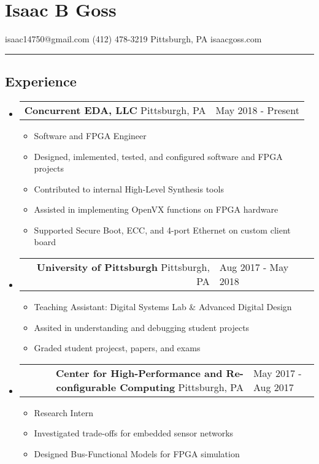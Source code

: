 \documentclass[18pt]{article}
\makeatletter
\providecommand{\tightlist}{
    \setlength{\itemsep}{0pt}\setlength{\parskip}{0pt}
}
\providecommand{\datetable}[2]{
    \begin{tabular*}{\textwidth}{@{}r @{\extracolsep{\fill}} l}
        #1 & #2
    \end{tabular*}
}
\makeatother
\begin{document}
    \section*{Isaac B Goss}\label{isaac-b-goss}
    isaac14750@gmail.com \textbar{} (412) 478-3219 \textbar{} Pittsburgh, PA \textbar{} isaacgoss.com
    
    \hrule

    \subsection*{Experience}\label{experience}
    \begin{itemize}[label={}]

        \item \datetable{
            \textbf{Concurrent EDA, LLC} \textbar{} Pittsburgh, PA
        }{May 2018 - Present}
        \begin{itemize}[topsep=0pt]\tightlist
            \item Software and FPGA Engineer
            \item Designed, imlemented, tested, and configured software and FPGA projects
            \item Contributed to internal High-Level Synthesis tools
            \item Assisted in implementing OpenVX functions on FPGA hardware
            \item Supported Secure Boot, ECC, and 4-port Ethernet on custom client board
        \end{itemize}

        \item \datetable{
            \textbf{University of Pittsburgh} \textbar{} Pittsburgh, PA
        }{Aug 2017 - May 2018}
        \begin{itemize}[topsep=0pt]\tightlist
            \item Teaching Assistant: Digital Systems Lab \& Advanced Digital Design
            \item Assited in understanding and debugging student projects
            \item Graded student projecst, papers, and exams
        \end{itemize}

        \item \datetable{
            \textbf{Center for High-Performance and Re-configurable Computing} \textbar{} Pittsburgh, PA
        }{May 2017 - Aug 2017}
        \begin{itemize}[topsep=0pt]\tightlist
            \item Research Intern
            \item Investigated trade-offs for embedded sensor networks
            \item Designed Bus-Functional Models for FPGA simulation
      	\end{itemize}

    \end{itemize}
\end{document}
